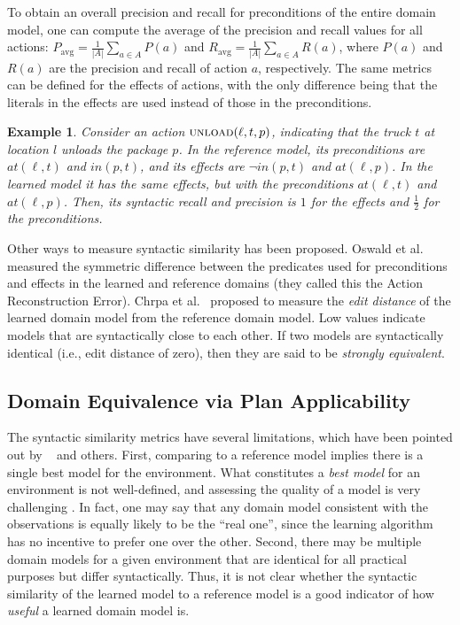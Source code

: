 \documentclass[letterpaper]{article} %
\newif\ifaddcomments
\newcommand{\roni}[1]{\ifaddcomments{\textcolor{red}{[Roni: #1]}}\fi}
\newtheorem{example}{Example}
\begin{document}
To obtain an overall precision and recall for preconditions of the entire domain model, one can compute the average of the precision and recall values for all actions:
$P_\text{avg}=\frac{1}{|A|}\sum_{a\in A} P(a)$ and $R_\text{avg}=\frac{1}{|A|}\sum_{a\in A} R(a)$, where $P(a)$ and $R(a)$ are the precision and recall of action $a$, respectively. 
The same metrics can be defined for the effects of actions, with the only difference being that the literals in the effects are used instead of those in the preconditions. 

\begin{example}
Consider an action $\textsc{unload}(\ell, t, p)$, indicating that the truck $t$ at location $l$ unloads the package $p$. 
In the reference model, its preconditions are $\textit{at}(\ell, t)$ and $\textit{in}(p,t)$, and its effects are $\neg \textit{in}(p,t)$ and $\textit{at}(\ell,p)$.
In the learned model it has the same effects, but with the preconditions $\textit{at}(\ell, t)$ and $\textit{at}(\ell, p)$. 
Then, its syntactic recall and precision is $1$ for the effects and $\frac 1 2$ for the preconditions. 
\end{example}

\roni{Edited this paragraph}
Other ways to measure syntactic similarity has been proposed. 
Oswald et al.~ measured the symmetric difference between the predicates used for preconditions and effects in the learned and reference domains (they called this the Action Reconstruction Error). 
Chrpa et al.~ proposed to measure the \emph{edit distance} of the learned domain model from the reference domain model. 
Low values indicate models that are syntactically close to each other. 
If two models are syntactically identical (i.e., edit distance of zero), then they are said to be \textit{strongly equivalent}. 


\roni{Next subsection is completely new, created after a careful read of the "Large Language Models as Planning Domain Generators" paper (a very interesting paper to read with a deep discussion on measuring learned domains).}
\subsection{Domain Equivalence via Plan Applicability}
The syntactic similarity metrics have several limitations, which have been pointed out by ~\citet{garrido2024challenges} and others. 
First, comparing to a reference model implies there is a single best model for the environment. 
What constitutes a \emph{best model} for an environment is not well-defined, and assessing the quality of a model is very challenging \citep{DBLP:conf/kcap/McCluskeyVV17}. 
In fact, one may say that any domain model consistent with the observations is equally likely to be the ``real one'', since the learning algorithm has no incentive to prefer one over the other. 
Second, there may be multiple domain models for a given environment that are identical for all practical purposes but differ syntactically. 
Thus, it is not clear whether the syntactic similarity of the learned model to a reference model is a good indicator of how \emph{useful} a learned domain model is. 
\end{document}
